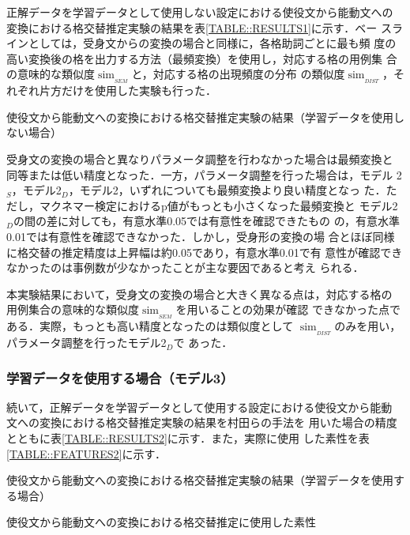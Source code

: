 \documentclass[japanese]{jnlp_1.4}
\begin{document}
   正解データを学習データとして使用しない設定における使役文から能動文への
   変換における格交替推定実験の結果を表\ref{TABLE::RESULTS1}に示す．ベー
   スラインとしては，受身文からの変換の場合と同様に，各格助詞ごとに最も頻
   度の高い変換後の格を出力する方法（最頻変換）を使用し，対応する格の用例集
   合の意味的な類似度$\operatorname{sim}_{_\mathit{SEM}}$と，対応する格の出現頻度の分布
   の類似度$\operatorname{sim}_{_\mathit{DIST}}$，それぞれ片方だけを使用した実験も行った．

\begin{table}[b]
    \caption{使役文から能動文への変換における格交替推定実験の結果（学習データを使用しない場合）}
\label{TABLE::RESULTS1}

   \end{table}
   
   受身文の変換の場合と異なりパラメータ調整を行わなかった場合は最頻変換と
   同等または低い精度となった．一方，パラメータ調整を行った場合は，モデル
   2$_S$，モデル2$_D$，モデル2，いずれについても最頻変換より良い精度となっ
   た．ただし，マクネマー検定におけるp値がもっとも小さくなった最頻変換と
   モデル2$_D$の間の差に対しても，有意水準0.05では有意性を確認できたもの
   の，有意水準0.01では有意性を確認できなかった．しかし，受身形の変換の場
   合とほぼ同様に格交替の推定精度は上昇幅は約0.05であり，有意水準0.01で有
   意性が確認できなかったのは事例数が少なかったことが主な要因であると考え
   られる．

   本実験結果において，受身文の変換の場合と大きく異なる点は，対応する格の
   用例集合の意味的な類似度$\operatorname{sim}_{_\mathit{SEM}}$を用いることの効果が確認
   できなかった点である．実際，もっとも高い精度となったのは類似度として
   $\operatorname{sim}_{_\mathit{DIST}}$のみを用い，パラメータ調整を行ったモデル2$_D$で
   あった．


  \subsubsection{学習データを使用する場合（モデル3）}

  続いて，正解データを学習データとして使用する設定における使役文から能動
  文への変換における格交替推定実験の結果を村田らの手法\cite{Murata2002}を
  用いた場合の精度とともに表\ref{TABLE::RESULTS2}に示す．また，実際に使用
  した素性を表\ref{TABLE::FEATURES2}に示す．
  
  \begin{table}[b]
   \caption{使役文から能動文への変換における格交替推定実験の結果（学習データを使用する場合）}
\label{TABLE::RESULTS2}

  \end{table}
  \begin{table}[b]
    \caption{使役文から能動文への変換における格交替推定に使用した素性}
    \label{TABLE::FEATURES2}

  \end{table}
\end{document}
